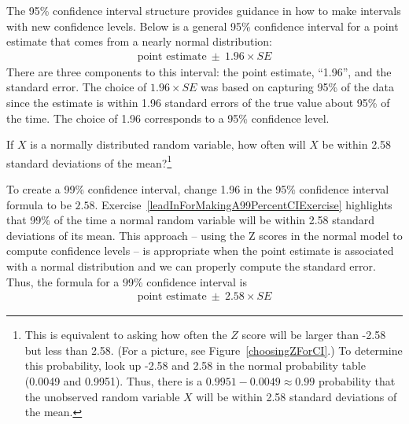 The 95\% confidence interval structure provides guidance in how to make intervals with new confidence levels. Below is a general 95\% confidence interval for a point estimate that comes from a nearly normal distribution:
\begin{eqnarray}
\text{point estimate}\ \pm\ 1.96\times SE
\end{eqnarray}
There are three components to this interval: the point estimate, ``1.96'', and the standard error. The choice of $1.96\times SE$ was based on capturing 95\% of the data since the estimate is within 1.96 standard errors of the true value about 95\% of the time. The choice of 1.96 corresponds to a 95\% confidence level. 

\begin{exercise} \label{leadInForMakingA99PercentCIExercise}
If $X$ is a normally distributed random variable, how often will $X$ be within 2.58 standard deviations of the mean?\footnote{This is equivalent to asking how often the $Z$ score will be larger than -2.58 but less than 2.58. (For a picture, see Figure~\ref{choosingZForCI}.) To determine this probability, look up -2.58 and 2.58 in the normal probability table (0.0049 and 0.9951). Thus, there is a $0.9951-0.0049 \approx 0.99$ probability that the unobserved random variable $X$ will be within 2.58 standard deviations of the mean.}
\end{exercise}

To create a 99\% confidence interval, change 1.96 in the 95\% confidence interval formula to be $2.58$. Exercise~\ref{leadInForMakingA99PercentCIExercise} highlights that 99\% of the time a normal random variable will be within 2.58 standard deviations of its mean. This approach -- using the Z scores in the normal model to compute confidence levels -- is appropriate when the point estimate is associated with a normal distribution and we can properly compute the standard error. Thus, the formula for a 99\% confidence interval is
\begin{eqnarray}
\text{point estimate}\ \pm\ 2.58\times SE
\label{99PercCIForMean}
\label{99PercCIForNormalPointEstimate}
\end{eqnarray}

